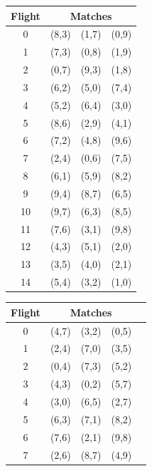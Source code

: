 \documentclass{llncs}
\begin{document}
\begin{center}
\begin{figure}[h]
\begin{minipage}[t]{0.5\textwidth}
\hspace{0.6cm}
\begin{tabular}{cccc}
 \toprule
Flight & \multicolumn{3}{c}{Matches} \\ \midrule
0 & (8,3) &  (1,7) &  (0,9) \\
1 & (7,3) &  (0,8) &  (1,9) \\
2 & (0,7) &  (9,3) &  (1,8) \\ 
3 & (6,2) &  (5,0) &  (7,4) \\
4 & (5,2) &  (6,4) &  (3,0) \\ 
5 & (8,6) &  (2,9) &  (4,1) \\ 
6 & (7,2) &  (4,8) &  (9,6) \\
7 & (2,4) &  (0,6) &  (7,5) \\ 
8 & (6,1) &  (5,9) &  (8,2) \\ 
9 & (9,4) &  (8,7) &  (6,5) \\ 
10 & (9,7) &  (6,3) &  (8,5) \\ 
11 & (7,6) &  (3,1) &  (9,8) \\
12 & (4,3) &  (5,1) &  (2,0) \\ 
13 & (3,5) &  (4,0) &  (2,1) \\ 
14 & (5,4) &  (3,2) &  (1,0) \\ \bottomrule
\end{tabular}
\label{10-06a}
\end{minipage}
\begin{minipage}[t]{0.5\textwidth}
\hspace{0.6cm}
\begin{tabular}{ccccc}
\toprule
Flight & \multicolumn{3}{c}{Matches} \\ \midrule
0 & (4,7) & (3,2) & (0,5) \\
1 & (2,4) & (7,0) & (3,5) \\
2 & (0,4) & (7,3) & (5,2) \\ 
3 & (4,3) & (0,2) & (5,7) \\ 
4 & (3,0) & (6,5) & (2,7) \\ 
5 & (6,3) & (7,1) & (8,2) \\
6 & (7,6) & (2,1) & (9,8) \\ 
7 & (2,6) & (8,7) & (4,9) \\ 

\end{tabular}
\end{minipage}
\end{figure}
\end{center}
\end{document}
